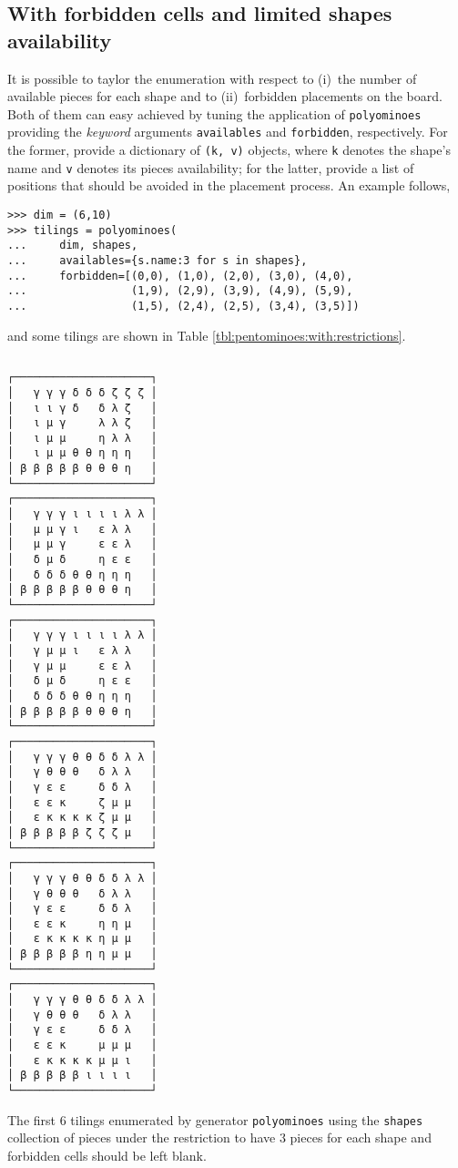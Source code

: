 \subsection*{With forbidden cells and limited shapes availability}

It is possible to taylor the enumeration with respect to (i)~the number of
available pieces for each shape and to (ii)~forbidden placements on the board.
Both of them can easy achieved by tuning the application of \verb|polyominoes|
providing the \textit{keyword} arguments \verb|availables| and
\verb|forbidden|, respectively. For the former, provide a dictionary of
\verb|(k, v)| objects, where \verb|k| denotes the shape's name and \verb|v|
denotes its pieces availability; for the latter, provide a list of
positions that should be avoided in the placement process. An example follows,
\begin{verbatim}
>>> dim = (6,10)
>>> tilings = polyominoes(
...     dim, shapes,
...     availables={s.name:3 for s in shapes},
...     forbidden=[(0,0), (1,0), (2,0), (3,0), (4,0),
...                (1,9), (2,9), (3,9), (4,9), (5,9),
...                (1,5), (2,4), (2,5), (3,4), (3,5)])
\end{verbatim}
and some tilings are shown in Table \ref{tbl:pentominoes:with:restrictions}.

\begin{margintable}%
\inputminted[fontsize=\footnotesize,]{python}{backtracking/pentominoes-regular-snippet.py}
\begin{Verbatim}[baselinestretch=0.1, fontsize=\footnotesize]
┌─────────────────────┐
│   γ γ γ δ δ δ ζ ζ ζ │
│   ι ι γ δ   δ λ ζ   │
│   ι μ γ     λ λ ζ   │
│   ι μ μ     η λ λ   │
│   ι μ μ θ θ η η η   │
│ β β β β β θ θ θ η   │
└─────────────────────┘
┌─────────────────────┐
│   γ γ γ ι ι ι ι λ λ │
│   μ μ γ ι   ε λ λ   │
│   μ μ γ     ε ε λ   │
│   δ μ δ     η ε ε   │
│   δ δ δ θ θ η η η   │
│ β β β β β θ θ θ η   │
└─────────────────────┘
┌─────────────────────┐
│   γ γ γ ι ι ι ι λ λ │
│   γ μ μ ι   ε λ λ   │
│   γ μ μ     ε ε λ   │
│   δ μ δ     η ε ε   │
│   δ δ δ θ θ η η η   │
│ β β β β β θ θ θ η   │
└─────────────────────┘
┌─────────────────────┐
│   γ γ γ θ θ δ δ λ λ │
│   γ θ θ θ   δ λ λ   │
│   γ ε ε     δ δ λ   │
│   ε ε κ     ζ μ μ   │
│   ε κ κ κ κ ζ μ μ   │
│ β β β β β ζ ζ ζ μ   │
└─────────────────────┘
┌─────────────────────┐
│   γ γ γ θ θ δ δ λ λ │
│   γ θ θ θ   δ λ λ   │
│   γ ε ε     δ δ λ   │
│   ε ε κ     η η μ   │
│   ε κ κ κ κ η μ μ   │
│ β β β β β η η μ μ   │
└─────────────────────┘
┌─────────────────────┐
│   γ γ γ θ θ δ δ λ λ │
│   γ θ θ θ   δ λ λ   │
│   γ ε ε     δ δ λ   │
│   ε ε κ     μ μ μ   │
│   ε κ κ κ κ μ μ ι   │
│ β β β β β ι ι ι ι   │
└─────────────────────┘
\end{Verbatim}
\caption{The first $6$ tilings enumerated by generator \texttt{polyominoes}
using the \texttt{shapes} collection of pieces under the restriction to
have $3$ pieces for each shape and forbidden cells should be left blank.}
\label{tbl:pentominoes:with:restrictions}
\end{margintable}

